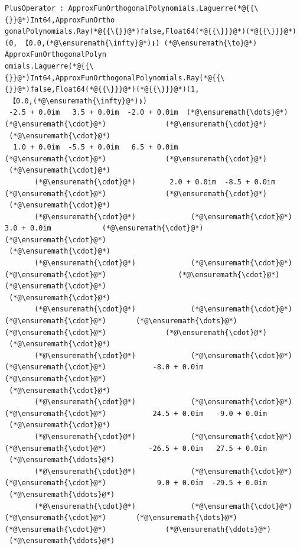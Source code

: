 \documentclass[12pt,a4paper]{article}
\begin{document}
\begin{lstlisting}
PlusOperator : ApproxFunOrthogonalPolynomials.Laguerre(*@{{\{}}@*)Int64,ApproxFunOrtho
gonalPolynomials.Ray(*@{{\{}}@*)false,Float64(*@{{\}}}@*)(*@{{\}}}@*)(0, 【0.0,(*@\ensuremath{\infty}@*)❫) (*@\ensuremath{\to}@*) ApproxFunOrthogonalPolyn
omials.Laguerre(*@{{\{}}@*)Int64,ApproxFunOrthogonalPolynomials.Ray(*@{{\{}}@*)false,Float64(*@{{\}}}@*)(*@{{\}}}@*)(1,
 【0.0,(*@\ensuremath{\infty}@*)❫)
 -2.5 + 0.0im   3.5 + 0.0im  -2.0 + 0.0im  (*@\ensuremath{\dots}@*)         (*@\ensuremath{\cdot}@*)              (*@\ensuremath{\cdot}@*)      
 (*@\ensuremath{\cdot}@*)
  1.0 + 0.0im  -5.5 + 0.0im   6.5 + 0.0im            (*@\ensuremath{\cdot}@*)              (*@\ensuremath{\cdot}@*)      
 (*@\ensuremath{\cdot}@*)
       (*@\ensuremath{\cdot}@*)        2.0 + 0.0im  -8.5 + 0.0im            (*@\ensuremath{\cdot}@*)              (*@\ensuremath{\cdot}@*)      
 (*@\ensuremath{\cdot}@*)
       (*@\ensuremath{\cdot}@*)             (*@\ensuremath{\cdot}@*)        3.0 + 0.0im            (*@\ensuremath{\cdot}@*)              (*@\ensuremath{\cdot}@*)      
 (*@\ensuremath{\cdot}@*)
       (*@\ensuremath{\cdot}@*)             (*@\ensuremath{\cdot}@*)             (*@\ensuremath{\cdot}@*)                 (*@\ensuremath{\cdot}@*)              (*@\ensuremath{\cdot}@*)      
 (*@\ensuremath{\cdot}@*)
       (*@\ensuremath{\cdot}@*)             (*@\ensuremath{\cdot}@*)             (*@\ensuremath{\cdot}@*)       (*@\ensuremath{\dots}@*)         (*@\ensuremath{\cdot}@*)              (*@\ensuremath{\cdot}@*)      
 (*@\ensuremath{\cdot}@*)
       (*@\ensuremath{\cdot}@*)             (*@\ensuremath{\cdot}@*)             (*@\ensuremath{\cdot}@*)           -8.0 + 0.0im         (*@\ensuremath{\cdot}@*)      
 (*@\ensuremath{\cdot}@*)
       (*@\ensuremath{\cdot}@*)             (*@\ensuremath{\cdot}@*)             (*@\ensuremath{\cdot}@*)           24.5 + 0.0im   -9.0 + 0.0im 
 (*@\ensuremath{\cdot}@*)
       (*@\ensuremath{\cdot}@*)             (*@\ensuremath{\cdot}@*)             (*@\ensuremath{\cdot}@*)          -26.5 + 0.0im   27.5 + 0.0im 
 (*@\ensuremath{\ddots}@*)
       (*@\ensuremath{\cdot}@*)             (*@\ensuremath{\cdot}@*)             (*@\ensuremath{\cdot}@*)            9.0 + 0.0im  -29.5 + 0.0im 
 (*@\ensuremath{\ddots}@*)
       (*@\ensuremath{\cdot}@*)             (*@\ensuremath{\cdot}@*)             (*@\ensuremath{\cdot}@*)       (*@\ensuremath{\dots}@*)         (*@\ensuremath{\cdot}@*)              (*@\ensuremath{\ddots}@*)      
 (*@\ensuremath{\ddots}@*)
\end{lstlisting}
\end{document}
